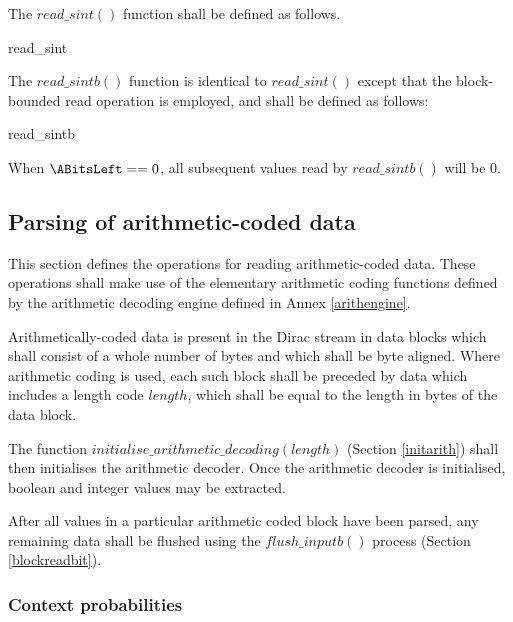 The $read\_sint()$ function shall be defined as follows.

\begin{pseudo}{read\_sint}{}
  \bsEND
\bsEND
{}
\end{pseudo}

The $read\_sintb()$ function is identical to $read\_sint()$ except that the block-bounded read
operation is employed, and shall be defined as follows:

\begin{pseudo}{read\_sintb}{}
  \bsEND
\bsEND
{}
\end{pseudo}

\begin{informative} When $\ABitsLeft==0$, all subsequent values read by $read\_sintb()$ will be 0.\end{informative}

\subsection{Parsing of arithmetic-coded data}

\label{arithdecoding}

This section defines the operations for reading arithmetic-coded
data. These operations shall  make use of the elementary arithmetic coding functions 
defined by the arithmetic decoding engine defined in Annex \ref{arithengine}.

Arithmetically-coded data is present in the Dirac stream in data blocks which shall consist of
a whole number of bytes and which shall be byte aligned. Where arithmetic coding is used, each such
block shall be preceded by data which includes a length code $length$, which shall be equal to the length in
bytes of the data block. 

The function $initialise\_arithmetic\_decoding(length)$
(Section \ref{initarith}) shall then initialises the arithmetic decoder. Once the arithmetic
decoder is initialised, boolean and integer values may be extracted.

After all values in a particular arithmetic coded block have been parsed, any remaining data
shall be flushed using the $flush\_inputb()$ process (Section \ref{blockreadbit}).

\subsubsection{Context probabilities}
\label{contextprobs}

